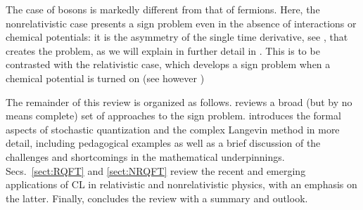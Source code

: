 \documentclass[../main.tex]{subfiles}
\begin{document}
The case of bosons is markedly different from that of fermions. Here, the nonrelativistic case presents a sign problem
even in the absence of interactions or chemical potentials: it is the asymmetry of the single time derivative, see ,
that creates the problem, as we will explain in further detail in .
This is to be contrasted with the relativistic case, which develops a sign problem when a chemical potential is turned on
(see however )

The remainder of this review is organized as follows.  reviews a broad (but by no means complete)
set of approaches to the sign problem. 
introduces the formal aspects of stochastic quantization and the complex Langevin method in more detail, including pedagogical examples as well as
a brief discussion of the challenges and shortcomings in the mathematical underpinnings. Secs.~\ref{sect:RQFT} and \ref{sect:NRQFT} review the recent and
emerging applications of CL in relativistic
and nonrelativistic physics, with an emphasis on the latter. Finally,  concludes the review with a summary and outlook.
\end{document}

